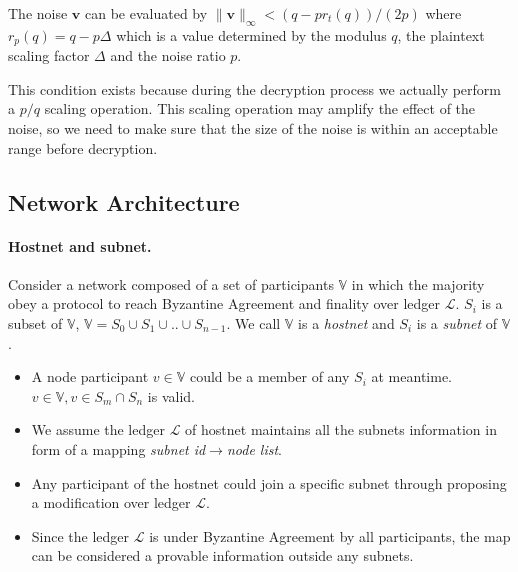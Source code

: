 \documentclass[11pt]{article}
\begin{document}
The noise $\mathbf{v}$ can be evaluated by $\lVert\mathbf{v}\rVert_\infty < (q-p r_t(q))/(2p)$ where $r_p(q)=q-p\Delta$ which is a value determined by the modulus $q$, the plaintext scaling factor $\Delta$ and the noise ratio $p$.

This condition exists because during the decryption process we actually perform a $p/q$ scaling operation. This scaling operation may amplify the effect of the noise, so we need to make sure that the size of the noise is within an acceptable range before decryption.


\subsection{Network Architecture}
\paragraph{Hostnet and subnet.}
Consider a network composed of a set of participants $\mathbb{V}$ in which the majority obey a protocol to reach Byzantine Agreement and finality\cite{grandpa} over ledger $\mathcal{L}$. $S_{i}$ is a subset of $\mathbb{V}$, \( \mathbb{V} = S_{0} \cup S_{1} \cup .. \cup S_{n-1}  \). We call $\mathbb{V}$ is a \textit{hostnet} and $S_{i}$ is a \textit{subnet} of $\mathbb{V}$.
\begin{itemize}
\item A node participant \( v \in \mathbb{V} \) could be a member of any $S_{i}$ at meantime.\( v \in \mathbb{V}, v \in S_{m} \cap S_{n} \) is valid.
\item We assume the ledger $\mathcal{L}$ of hostnet maintains all the subnets information in form of a mapping \textit{subnet id}\( \rightarrow \)\textit{node list}.
\item Any participant of the hostnet could join a specific subnet through proposing a modification over ledger $\mathcal{L}$.
\item Since the ledger $\mathcal{L}$ is under Byzantine Agreement by all participants, the map can be considered a provable information outside any subnets.
\end{itemize}
\end{document}
